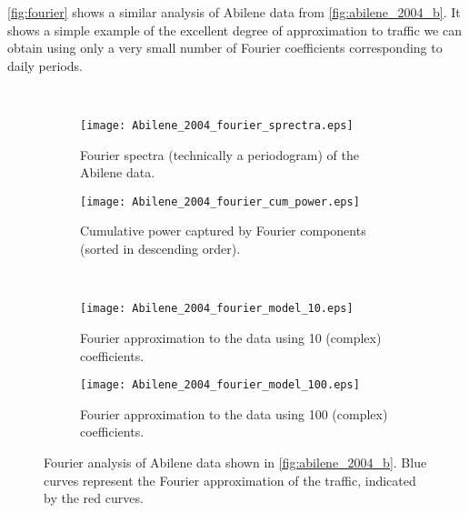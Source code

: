 \autoref{fig:fourier} shows a similar analysis of Abilene data from
\autoref{fig:abilene_2004_b}. It shows a simple example of the
excellent degree of approximation to traffic we can obtain using only
a very small number of Fourier coefficients corresponding to daily
periods. 
\begin{figure}[thbp] 
  \begin{center}
    \mbox{ }\hfill
    \begin{subfigure}[b]{\twoup}
      \centering
      \texttt{[image: Abilene\_2004\_fourier\_sprectra.eps]}
      \vspace{-5mm}
      \caption{Fourier spectra (technically a periodogram) of the
        Abilene data.}
      \label{fig:fourier_a}
    \end{subfigure}
    \hfill
    \begin{subfigure}[b]{0.47\textwidth}
      \centering
      \texttt{[image: Abilene\_2004\_fourier\_cum\_power.eps]}
      \vspace{-5mm}
      \caption{Cumulative power captured by Fourier components
        (sorted in descending order).}
      \label{fig:fourier_b}
    \end{subfigure}  
    \hfill \mbox{ }

      \vspace{5mm}
    \begin{subfigure}[b]{\oneup}
      \centering
      \texttt{[image: Abilene\_2004\_fourier\_model\_10.eps]}
       \vspace{-9mm}
     \caption{Fourier approximation to the data using 10 (complex) coefficients.}
      \label{fig:fourier_c} 
    \end{subfigure}  

      \vspace{5mm}
    \begin{subfigure}[b]{\oneup}
      \centering
      \texttt{[image: Abilene\_2004\_fourier\_model\_100.eps]}
      \vspace{-9mm}
      \caption{Fourier approximation to the data using 100 (complex) coefficients.}
      \label{fig:fourier_d}
    \end{subfigure}  
   
    \caption{Fourier analysis of Abilene data shown in \autoref{fig:abilene_2004_b}. Blue curves represent the
    Fourier approximation of the traffic, indicated by the red curves.\label{fig:fourier}}
  \end{center}
\end{figure}         
